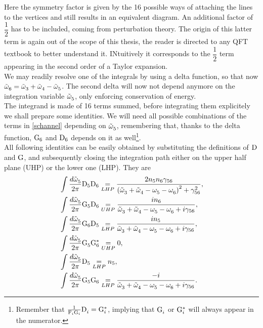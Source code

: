 Here the symmetry factor is given by the 16 possible ways of attaching the lines to the vertices and still results in an equivalent diagram. 
An additional factor of $\dfrac{1}{2}$ has to be included, coming from perturbation theory. The origin of this latter term is again out of the scope of this thesis, the reader is directed
to any QFT textbook to better understand it. INtuitively it corresponds to the $\dfrac{1}{2}$ term appearing in the second order of a Taylor expansion. \\
We may readily resolve one of the integrals by using a delta function, so that now $\tilde{\omega}^{}_6 = \tilde{\omega}^{}_3 + \tilde{\omega}^{}_4 - \tilde{\omega}^{}_5$. The second delta will now not depend 
anymore on the integration variable $\tilde{\omega}^{}_5$, only enforcing conservation of energy. \\
The integrand is made of 16 terms summed, before integrating them explicitely we shall prepare some identities. We will need all possible combinations of 
the terms in \eqref{schannel} depending on $\tilde{\omega}^{}_5$, remembering that, thanks to the delta function, $\mathrm{G}_6$ and $\mathrm{D}_6$ depends on it as well\footnote{
    Remember that $\frac{1}{\mathrm{F}_i \mathrm{G}_i}\mathrm{D}^{}_i = \mathrm{G}_i^*$, implying that $\mathrm{G}^{}_i$ or $\mathrm{G}^{*}_i$ will always appear in the numerator.
}. \\
All following identities can be easily obtained by substituting the definitions of $\mathrm{D}$ and $\mathrm{G}$, and subsequently closing the integration path either 
on the upper half plane (UHP) or the lower one (LHP). They are
\begin{align}
    &\int \frac{d\tilde{\omega}^{}_5}{2\pi} \mathrm{D}_5 \mathrm{D}_6 \underset{LHP}{=} \frac{2n_5n_6\gamma_{56}}{\left( \tilde{\omega}^{}_3 + \tilde{\omega}^{}_4 - \omega^{}_5 - \omega^{}_6\right)^2 + \gamma^2_{56}}, 
    \label{identity1}\\
    &\int \frac{d\tilde{\omega}^{}_5}{2\pi} \mathrm{G}_5 \mathrm{D}_6 \underset{UHP}{=} \frac{in_6}{\tilde{\omega}^{}_3 + \tilde{\omega}^{}_4 - \omega^{}_5 - \omega^{}_6 +i\gamma_{56}}, \\
    &\int \frac{d\tilde{\omega}^{}_5}{2\pi} \mathrm{G}_6 \mathrm{D}_5 \underset{LHP}{=} \frac{in_5}{\tilde{\omega}^{}_3 + \tilde{\omega}^{}_4 - \omega^{}_5 - \omega^{}_6 +i\gamma_{56}}, \\
    &\int \frac{d\tilde{\omega}^{}_5}{2\pi} \mathrm{G}_5^{} \mathrm{G}_6^* \underset{UHP}{=} 0, \\
    &\int \frac{d\tilde{\omega}^{}_5}{2\pi} \mathrm{D}_5 \underset{LHP}{=} n_5, \label{identity5}\\
    &\int \frac{d\tilde{\omega}^{}_5}{2\pi} \mathrm{G}_5\mathrm{G}_6 \underset{LHP}{=} \frac{-i}{\tilde{\omega}^{}_3 + \tilde{\omega}^{}_4 - \omega^{}_5 - \omega^{}_6 +i\gamma_{56}}.
    \label{identity6}
\end{align}  
